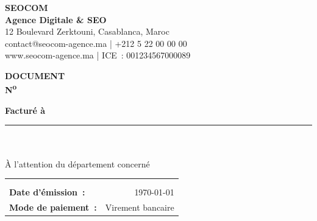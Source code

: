 \documentclass[11pt,a4paper]{article}
\begin{document}

\vspace{-1.35cm}
\noindent
\begin{minipage}[t]{0.55\textwidth}
  \vspace{0.4cm}
  {\color{white}\Huge \textbf{SEOCOM}}\\[2pt]
  {\color{seoaccent}\large \textbf{Agence Digitale \& SEO}}\\[10pt]
  {\color{white}\small
    12 Boulevard Zerktouni, Casablanca, Maroc\\
    contact@seocom-agence.ma \quad | \quad +212 5 22 00 00 00\\
    www.seocom-agence.ma \quad | \quad ICE~: 001234567000089
  }
\end{minipage}
\hfill
\begin{minipage}[t]{0.38\textwidth}
  \vspace{0.4cm}
  \raggedleft
  {\color{white}\LARGE \textbf{DOCUMENT}}\\[6pt]
  {\color{seoaccent}\Large \textbf{N\textsuperscript{o} }}
\end{minipage}

\vspace{0.7cm}

\noindent
\begin{minipage}[t]{0.48\textwidth}
  {\color{seoblue}\bfseries\large Facturé à}\\[4pt]
  {\color{seogray}\rule{3.5cm}{0.6pt}}\\[6pt]
  \textbf{}\\
  À l'attention du département concerné\\
\end{minipage}
\hfill
\begin{minipage}[t]{0.46\textwidth}
  \raggedleft
  \begin{tabularx}{\linewidth}{>{\raggedright\arraybackslash}X r}
    \multicolumn{2}{r}{\color{seoblue}\bfseries\large Détails} \\[2pt]
    \multicolumn{2}{r}{\color{seogray}\rule{3.5cm}{0.6pt}} \\[6pt]
    \textbf{Date d'émission~:} & \today \\[3pt]
    \textbf{Mode de paiement~:} & Virement bancaire \\[3pt]
  \end{tabularx}
\end{minipage}
\end{document}
